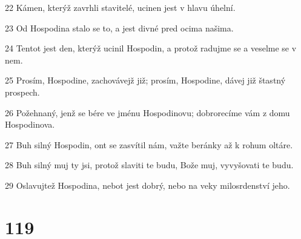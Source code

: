 \par 22 Kámen, kterýž zavrhli stavitelé, ucinen jest v hlavu úhelní.
\par 23 Od Hospodina stalo se to, a jest divné pred ocima našima.
\par 24 Tentot jest den, kterýž ucinil Hospodin, a protož radujme se a veselme se v nem.
\par 25 Prosím, Hospodine, zachovávejž již; prosím, Hospodine, dávej již štastný prospech.
\par 26 Požehnaný, jenž se bére ve jménu Hospodinovu; dobrorecíme vám z domu Hospodinova.
\par 27 Buh silný Hospodin, ont se zasvítil nám, važte beránky až k rohum oltáre.
\par 28 Buh silný muj ty jsi, protož slaviti te budu, Bože muj, vyvyšovati te budu.
\par 29 Oslavujtež Hospodina, nebot jest dobrý, nebo na veky milosrdenství jeho.

\chapter{119}

